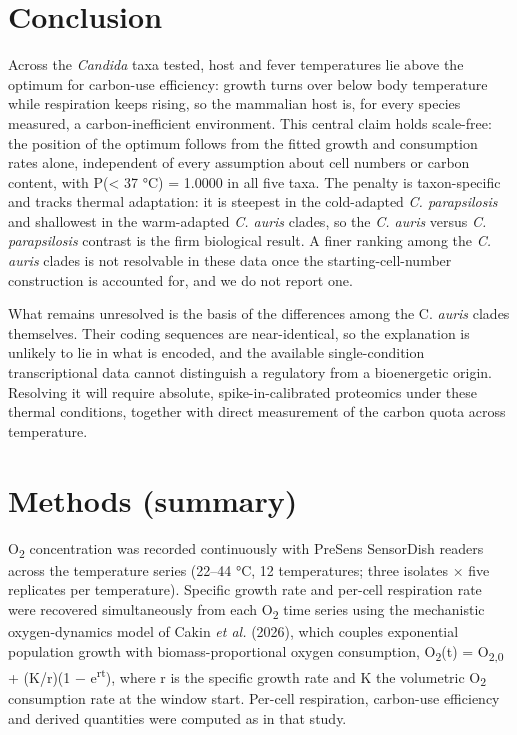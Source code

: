 \documentclass[
]{article}
\begin{document}
\section{\texorpdfstring{\textbf{Conclusion}}{Conclusion}}\label{conclusion}

Across the \emph{Candida} taxa tested, host and fever temperatures lie
above the optimum for carbon-use efficiency: growth turns over below
body temperature while respiration keeps rising, so the mammalian host
is, for every species measured, a carbon-inefficient environment. This
central claim holds scale-free: the position of the optimum follows from
the fitted growth and consumption rates alone, independent of every
assumption about cell numbers or carbon content, with P(\textless{} 37
°C) = 1.0000 in all five taxa. The penalty is taxon-specific and tracks
thermal adaptation: it is steepest in the cold-adapted \emph{C.
parapsilosis} and shallowest in the warm-adapted \emph{C. auris} clades,
so the \emph{C. auris} versus \emph{C. parapsilosis} contrast is the
firm biological result. A finer ranking among the \emph{C. auris} clades
is not resolvable in these data once the starting-cell-number
construction is accounted for, and we do not report one.

What remains unresolved is the basis of the differences among the C.
\emph{auris} clades themselves. Their coding sequences are
near-identical, so the explanation is unlikely to lie in what is
encoded, and the available single-condition transcriptional data cannot
distinguish a regulatory from a bioenergetic origin. Resolving it will
require absolute, spike-in-calibrated proteomics under these thermal
conditions, together with direct measurement of the carbon quota across
temperature.

\section{\texorpdfstring{\textbf{Methods
(summary)}}{Methods (summary)}}\label{methods-summary}

O\textsubscript{2} concentration was recorded continuously with PreSens
SensorDish readers across the temperature series (22--44 °C, 12
temperatures; three isolates × five replicates per temperature).
Specific growth rate and per-cell respiration rate were recovered
simultaneously from each O\textsubscript{2} time series using the
mechanistic oxygen-dynamics model of Cakin \emph{et al.} (2026), which
couples exponential population growth with biomass-proportional oxygen
consumption, O\textsubscript{2}(t) = O\textsubscript{2,0} + (K/r)(1 −
e\textsuperscript{rt}), where r is the specific growth rate and K the
volumetric O\textsubscript{2} consumption rate at the window start.
Per-cell respiration, carbon-use efficiency and derived quantities were
computed as in that study.
\end{document}
